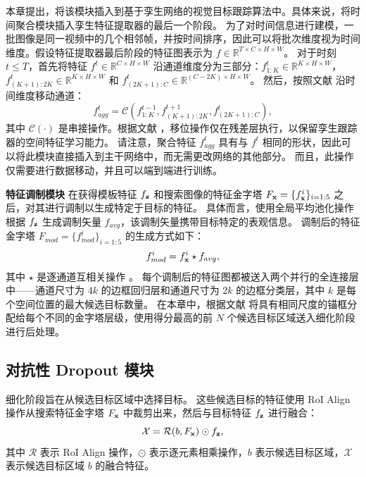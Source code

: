 本章提出，将该模块插入到基于孪生网络的视觉目标跟踪算法中。具体来说，将时间聚合模块插入孪生特征提取器的最后一个阶段。
为了对时间信息进行建模，一批图像是同一视频中的几个相邻帧，并按时间排序，因此可以将批次维度视为时间维度。假设特征提取器最后阶段的特征图表示为 $f \in \mathbb R ^ {T \times C \times H \times W}$。
对于时刻 $t \leq T$，首先将特征 $f^t \in \mathbb R ^ {C \times H \times W}$ 沿通道维度分为三部分：$f_{1:K}^t \in \mathbb R ^ {K \times H \times W}$，$f_{(K+1):2K}^t \in \mathbb R ^ {K \times H \times W}$ 和 $f_{(2K+1):C}^t \in \mathbb R ^ {(C-2K) \times H \times W}$。
然后，按照文献 \cite{lin2019tsm} 沿时间维度移动通道：
\begin{equation}
    f_{agg}^t = \mathcal{C}(f_{{1:K}}^{t-1}, f_{(K+1):2K}^{t+1}, f_{(2K+1):C}^{t}),
\end{equation}
其中 $\mathcal{C}(\cdot)$ 是串接操作。根据文献 \cite{lin2019tsm}，移位操作仅在残差层执行，以保留孪生跟踪器的空间特征学习能力。
请注意，聚合特征 $f_{agg}^t$ 具有与 $f^t$ 相同的形状，因此可以将此模块直接插入到主干网络中，而无需更改网络的其他部分。
而且，此操作仅需要进行数据移动，并且可以端到端进行训练。

\textbf{特征调制模块} 在获得模板特征 $f_{\textbf z}$ 和搜索图像的特征金字塔 $F_{\textbf x} = \{f_{\textbf x}^i\}_{i=1:5}$ 之后，对其进行调制以生成特定于目标的特征。
具体而言，使用全局平均池化操作根据 $f_{\textbf z}$ 生成调制矢量 $f_{avg}$，该调制矢量携带目标特定的表观信息。
调制后的特征金字塔 $F_{mod} = \{f_{mod}^i\}_{i=1:5}$ 的生成方式如下：
\begin{equation}
    f_{mod}^i = f^i_{\textbf x} \star f_{avg},
\end{equation}
其中 $\star$ 是逐通道互相关操作 \cite{SiamRPN++}。
每个调制后的特征图都被送入两个并行的全连接层中——通道尺寸为 $4k$ 的边框回归层和通道尺寸为 $2k$ 的边框分类层，其中 $k$ 是每个空间位置的最大候选目标数量。
在本章中，根据文献 \cite{lin2017feature} 将具有相同尺度的锚框分配给每个不同的金字塔层级，使用得分最高的前 $N$ 个候选目标区域送入细化阶段进行后处理。

\subsection{对抗性 Dropout 模块}
\label{sec:stage2}
细化阶段旨在从候选目标区域中选择目标。
这些候选目标的特征使用 RoI Align \cite{he2017mask} 操作从搜索特征金字塔 $F_{\textbf x}$ 中裁剪出来，然后与目标特征 $f_{\textbf z}$ 进行融合：
\begin{equation}
    \mathcal{X} = \mathcal{R}(b, F_{\textbf x}) \odot f_{\textbf z},
\end{equation}
其中 $\mathcal{R}$ 表示 RoI Align 操作，$\odot$ 表示逐元素相乘操作，$b$ 表示候选目标区域，$\mathcal{X}$ 表示候选目标区域 $b$ 的融合特征。

